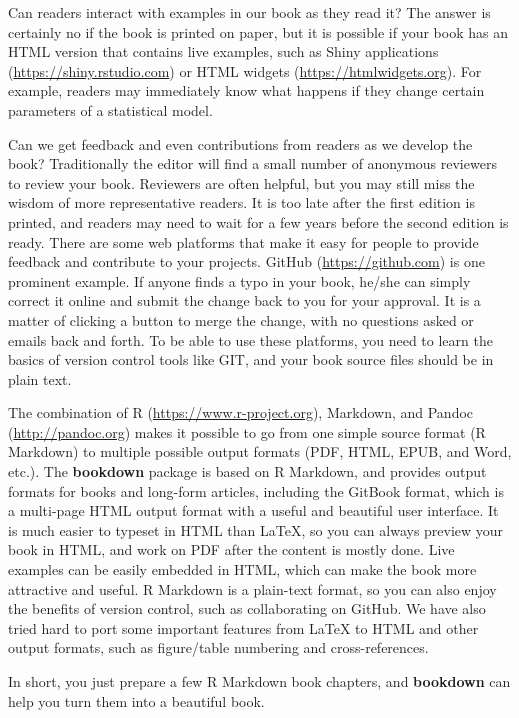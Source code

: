 \documentclass[
  12pt,
]{krantz}
\theoremstyle{definition}
\theoremstyle{definition}
\theoremstyle{definition}
\theoremstyle{definition}
\theoremstyle{remark}
\begin{document}
Can readers interact with examples in our book as they read it? The answer is certainly no if the book is printed on paper, but it is possible if your book has an HTML version that contains live examples, such as Shiny applications (\url{https://shiny.rstudio.com}) or HTML widgets (\url{https://htmlwidgets.org}). For example, readers may immediately know what happens if they change certain parameters of a statistical model.

Can we get feedback and even contributions from readers as we develop the book? Traditionally the editor will find a small number of anonymous reviewers to review your book. Reviewers are often helpful, but you may still miss the wisdom of more representative readers. It is too late after the first edition is printed, and readers may need to wait for a few years before the second edition is ready. There are some web platforms that make it easy for people to provide feedback and contribute to your projects. GitHub (\url{https://github.com}) is one prominent example. If anyone finds a typo in your book, he/she can simply correct it online and submit the change back to you for your approval. It is a matter of clicking a button to merge the change, with no questions asked or emails back and forth. To be able to use these platforms, you need to learn the basics of version control tools like GIT, and your book source files should be in plain text.

The combination of R (\url{https://www.r-project.org}), Markdown, and Pandoc (\url{http://pandoc.org}) makes it possible to go from one simple source format (R Markdown) to multiple possible output formats (PDF, HTML, EPUB, and Word, etc.). The \textbf{bookdown} package is based on R Markdown, and provides output formats for books and long-form articles, including the GitBook format, which is a multi-page HTML output format with a useful and beautiful user interface. It is much easier to typeset in HTML than LaTeX, so you can always preview your book in HTML, and work on PDF after the content is mostly done. Live examples can be easily embedded in HTML, which can make the book more attractive and useful. R Markdown is a plain-text format, so you can also enjoy the benefits of version control, such as collaborating on GitHub. We have also tried hard to port some important features from LaTeX to HTML and other output formats, such as figure/table numbering and cross-references.

In short, you just prepare a few R Markdown book chapters, and \textbf{bookdown} can help you turn them into a beautiful book.
\end{document}
